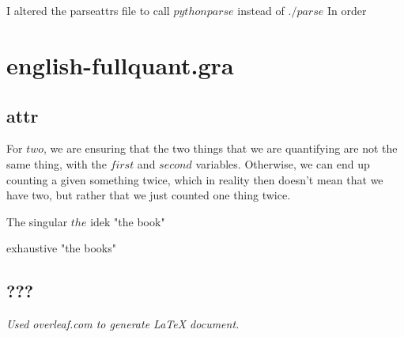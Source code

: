 \documentclass[12pt, letterpaper]{article}
\begin{document}
\section{}
I altered the parseattrs file to call
$python parse$
instead of $./parse$
In order


\section{english-fullquant.gra}
\subsection{attr}


For $two$, we are ensuring that the two things that we are quantifying are not the same thing, with the $first$ and $second$ variables. Otherwise, we can end up counting a given something twice, which in reality then doesn't mean that we have two, but rather that we just counted one thing twice. 


The singular $the$ idek
"the book"

exhaustive 
"the books"

\subsection{???}

\begin{center}
\textit{Used overleaf.com to generate LaTeX document.}
\end{center}
\end{document}
